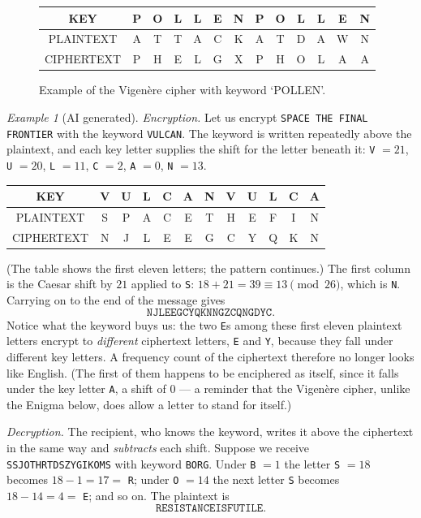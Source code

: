 \documentclass{article}
\theoremstyle{plain}
\theoremstyle{definition}
\theoremstyle{remark}
\newtheorem{example}[theorem]{Example}
\numberwithin{theorem}{section}
\newcommand{\bespokedemo}[1]{\href{bespoke:#1}{\textsf{[\,interactive: #1\,]}}}
\newif\ifweb \webfalse
\DeclareRobustCommand{\webonly}[1]{\ifweb#1\fi}
\begin{document}
\begin{figure}
\begin{center}
  \begin{tabular}{c|cccccccccccc}
       KEY & P & O & L & L & E & N & P & O & L & L & E & N \\
       \hline
       PLAINTEXT & A & T & T & A & C & K & A & T & D & A & W & N \\
       \hline
       CIPHERTEXT & P & H & E & L & G & X & P & H & O & L & A & A \\
     \end{tabular}
\end{center}
     \caption{Example of the Vigen\`ere cipher with keyword `POLLEN'.}
\label{fig:vig-example}
\end{figure}

\webonly{\bespokedemo{vigenere-tool}}

\begin{example}[AI generated]
\emph{Encryption.}  Let us encrypt \texttt{SPACE THE FINAL FRONTIER} with the keyword \texttt{VULCAN}.  The keyword is written repeatedly above the plaintext, and each key letter supplies the shift for the letter beneath it:  \texttt{V} $= 21$, \texttt{U} $=20$, \texttt{L} $=11$, \texttt{C} $=2$, \texttt{A} $=0$, \texttt{N} $=13$.
\begin{center}
\begin{tabular}{c|ccccccccccc}
  KEY & V & U & L & C & A & N & V & U & L & C & A \\ \hline
  PLAINTEXT & S & P & A & C & E & T & H & E & F & I & N \\ \hline
  CIPHERTEXT & N & J & L & E & E & G & C & Y & Q & K & N \\
\end{tabular}
\end{center}
(The table shows the first eleven letters; the pattern continues.)  The first column is the Caesar shift by $21$ applied to \texttt{S}:  $18 + 21 = 39 \equiv 13 \pmod{26}$, which is \texttt{N}.  Carrying on to the end of the message gives
\[
	\texttt{NJLEEGCYQKNNGZCQNGDYC}.
\]
Notice what the keyword buys us:  the two \texttt{E}s among these first eleven plaintext letters encrypt to \emph{different} ciphertext letters, \texttt{E} and \texttt{Y}, because they fall under different key letters.  A frequency count of the ciphertext therefore no longer looks like English.  (The first of them happens to be enciphered as itself, since it falls under the key letter \texttt{A}, a shift of $0$ --- a reminder that the Vigen\`ere cipher, unlike the Enigma below, does allow a letter to stand for itself.)

\emph{Decryption.}  The recipient, who knows the keyword, writes it above the ciphertext in the same way and \emph{subtracts} each shift.  Suppose we receive \texttt{SSJOTHRTDSZYGIKOMS} with keyword \texttt{BORG}.  Under \texttt{B} $=1$ the letter \texttt{S} $=18$ becomes $18 - 1 = 17 = $ \texttt{R}; under \texttt{O} $= 14$ the next letter \texttt{S} becomes $18 - 14 = 4 = $ \texttt{E}; and so on.  The plaintext is
\[
	\texttt{RESISTANCEISFUTILE}.
\]
\end{example}
\end{document}
